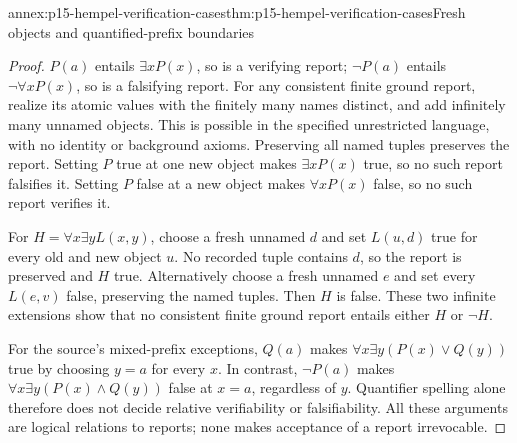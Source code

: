\begin{annexitem}{annex:p15-hempel-verification-cases}{thm:p15-hempel-verification-cases}{Fresh objects and quantified-prefix boundaries}
\begin{proof}
$P(a)$ entails $\exists xP(x)$, so is a verifying report; $\neg P(a)$
entails $\neg\forall xP(x)$, so is a falsifying report. For any
consistent finite ground report, realize its atomic values with the
finitely many names distinct, and add infinitely many unnamed objects.
This is possible in the specified unrestricted language, with no
identity or background axioms. Preserving all named tuples preserves
the report. Setting $P$ true at one new object makes $\exists xP(x)$
true, so no such report falsifies it. Setting $P$ false at a new
object makes $\forall xP(x)$ false, so no such report verifies it.

For $H=\forall x\exists yL(x,y)$, choose a fresh unnamed $d$ and
set $L(u,d)$ true for every old and new object $u$. No recorded
tuple contains $d$, so the report is preserved and $H$ true.
Alternatively choose a fresh unnamed $e$ and set every $L(e,v)$
false, preserving the named tuples. Then $H$ is false. These two
infinite extensions show that no consistent finite ground report
entails either $H$ or $\neg H$.

For the source's mixed-prefix exceptions, $Q(a)$ makes
$\forall x\exists y(P(x)\lor Q(y))$ true by choosing $y=a$
for every $x$. In contrast, $\neg P(a)$ makes
$\forall x\exists y(P(x)\land Q(y))$ false at $x=a$, regardless
of $y$. Quantifier spelling alone therefore does not decide relative
verifiability or falsifiability. All these arguments are logical
relations to reports; none makes acceptance of a report irrevocable.
\end{proof}
\end{annexitem}

